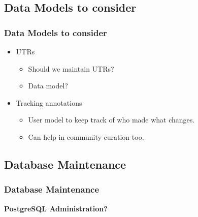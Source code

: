 \documentclass[hyperref={pdfpagelabels=false}, compress]{beamer}
\begin{document}
\subsection{Data Models to consider}
\begin{frame}
    \frametitle{Data Models to consider}
	\begin{itemize}
		\item UTRs
		\begin{itemize}
			\item Should we maintain UTRs?
			\item Data model?
		\end{itemize}
		\item Tracking annotations
		\begin{itemize}
			\item User model to keep track of who made what changes. 
			\item Can help in community curation too.
		\end{itemize}
	\end{itemize}        
\end{frame}

\subsection{Database Maintenance}
\begin{frame}
   \frametitle{Database Maintenance}
   \begin{center}
   		\textbf{\Large PostgreSQL Administration?}
   	\end{center}
\end{frame}

\end{document}
